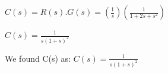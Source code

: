 \documentclass{beamer}
\begin{document}


$C(s) = R(s).G(s) = (\frac{1}{s})  (\frac{1}{1+2s+s^2})$

$C(s) =  \frac{1}{s(1+s)^2}$

    
We found C(s) as:
$C(s) =  \frac{1}{s(1+s)^2}$
\end{document}
